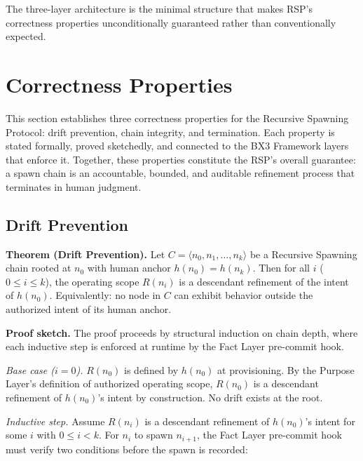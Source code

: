 The three-layer architecture is the minimal structure that makes RSP's correctness properties unconditionally guaranteed rather than conventionally expected.

\section{Correctness Properties}
\label{sec:rs-correctness}

This section establishes three correctness properties for the Recursive Spawning Protocol: drift prevention, chain integrity, and termination. Each property is stated formally, proved sketchedly, and connected to the BX3 Framework layers that enforce it. Together, these properties constitute the RSP's overall guarantee: a spawn chain is an accountable, bounded, and auditable refinement process that terminates in human judgment.

\subsection{Drift Prevention}
\label{sec:rs-drift-prevention-proof}

\medskip
\noindent\textbf{Theorem (Drift Prevention).} Let $C = \langle n_0, n_1, \ldots, n_k \rangle$ be a Recursive Spawning chain rooted at $n_0$ with human anchor $h(n_0) = h(n_k)$. Then for all $i$ ($0 \leq i \leq k$), the operating scope $R(n_i)$ is a descendant refinement of the intent of $h(n_0)$. Equivalently: no node in $C$ can exhibit behavior outside the authorized intent of its human anchor.

\medskip
\noindent\textbf{Proof sketch.} The proof proceeds by structural induction on chain depth, where each inductive step is enforced at runtime by the Fact Layer pre-commit hook.

\medskip
\textit{Base case ($i=0$).} $R(n_0)$ is defined by $h(n_0)$ at provisioning. By the Purpose Layer's definition of authorized operating scope, $R(n_0)$ is a descendant refinement of $h(n_0)$'s intent by construction. No drift exists at the root.

\medskip
\textit{Inductive step.} Assume $R(n_i)$ is a descendant refinement of $h(n_0)$'s intent for some $i$ with $0 \leq i < k$. For $n_i$ to spawn $n_{i+1}$, the Fact Layer pre-commit hook must verify two conditions before the spawn is recorded:

